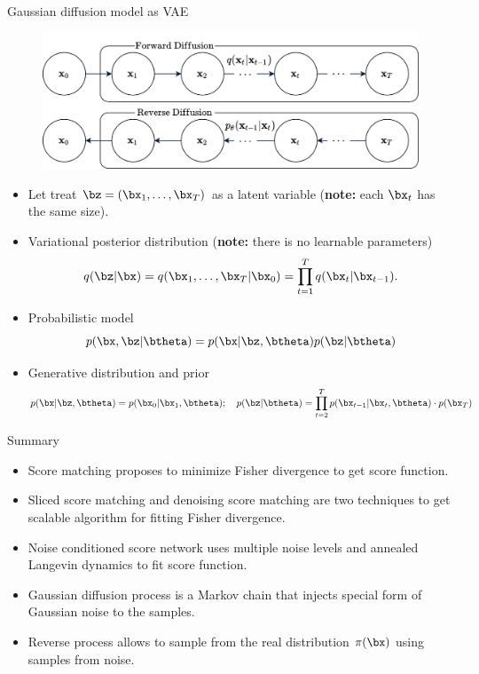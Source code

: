 \begin{frame}{Gaussian diffusion model as VAE}
	\vspace{-0.2cm}
	\begin{figure}
		\includegraphics[width=0.65\linewidth]{figs/diffusion_pgm}
	\end{figure}
	\begin{itemize}
		\item Let treat $\bz = (\bx_1, \dots, \bx_T)$ as a latent variable (\textbf{note:} each $\bx_t$ has the same size).
		\item Variational posterior distribution (\textbf{note:} there is no learnable parameters)
		\vspace{-0.4cm}
		\[
			q(\bz | \bx) = q(\bx_1, \dots, \bx_T | \bx_0) = \prod_{t = 1}^T q(\bx_t | \bx_{t - 1}).
		\]
		\vspace{-0.5cm}
		\item Probabilistic model
		\vspace{-0.2cm}
		\[
			p(\bx, \bz | \btheta) = p(\bx | \bz, \btheta) p(\bz | \btheta)
		\]
		\item Generative distribution and prior
		\vspace{-0.3cm}
		\[
			p(\bx | \bz, \btheta) = p(\bx_0 | \bx_1, \btheta); \quad 
			p(\bz | \btheta) = \prod_{t=2}^T p(\bx_{t - 1} | \bx_t, \btheta)  \cdot p(\bx_T)
		\]
	\end{itemize}
\end{frame}
\begin{frame}{Summary}
	\begin{itemize}
		\item Score matching proposes to minimize Fisher divergence to get score function.
		\vfill
		\item Sliced score matching and denoising score matching are two techniques to get scalable algorithm for fitting Fisher divergence.
		\vfill
		\item Noise conditioned score network uses multiple noise levels and annealed Langevin dynamics to fit score function.
		\vfill
		\item Gaussian diffusion process is a Markov chain that injects special form of Gaussian noise to the samples.
		\vfill
		\item Reverse process allows to sample from the real distribution $\pi(\bx)$ using samples from noise.
	\end{itemize}
\end{frame}
 